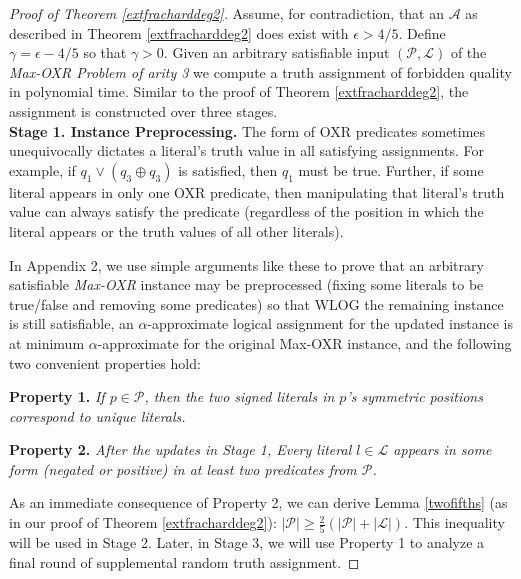\documentclass{article}
\newcommand{\ep}[0]{\epsilon}
\begin{document}
\begin{proof}[Proof of Theorem \ref{extfracharddeg2}]  Assume, for contradiction, that an $\mathcal{A}$ as described in Theorem \ref{extfracharddeg2} does exist with $\ep>4/5$. Define $\gamma=\ep-4/5$ so that $\gamma>0$. Given an arbitrary satisfiable input $(\mathcal{P}, \mathcal{L})$ of the \textit{Max-OXR Problem of arity 3} we compute a truth  assignment of forbidden quality in polynomial time. Similar to the proof of Theorem \ref{extfracharddeg2}, the assignment is constructed over three stages.\\

\noindent \textbf{Stage 1. Instance Preprocessing.} The form of OXR predicates sometimes unequivocally dictates a literal's truth value in all satisfying assignments. For example, if $q_1 \vee (q_3 \oplus q_3)$ is satisfied, then $q_1$ must be true. Further, if some literal appears in only one OXR predicate, then manipulating that literal's truth value can always satisfy the predicate (regardless of the position in which the literal appears or the truth values of all other literals).  

In Appendix 2,  we use simple arguments like these to prove that an arbitrary satisfiable \textit{Max-OXR} instance may be preprocessed (fixing some literals to be true/false and removing some predicates) so that
WLOG the remaining instance is still satisfiable, an $\alpha$-approximate logical assignment for the updated instance is at minimum $\alpha$-approximate for the original Max-OXR instance, and
the following two convenient properties hold:

\vspace{1mm}
\noindent \textbf{Property 1.} \textit{If $p\in \mathcal{P}$, then the two signed literals in $p$'s symmetric positions correspond to unique literals.} 
\vspace{1mm}


\noindent \textbf{Property 2.} \textit{After the updates in Stage 1, Every literal $l\in \mathcal{L}$ appears in some form (negated or positive) in at least two predicates from $\mathcal{P}$.}

\vspace{1mm}
\noindent As an immediate consequence of Property 2, we can derive Lemma \ref{twofifths} (as in our proof of Theorem \ref{extfracharddeg2}): $|\mathcal{P}|\geq \frac{2}{5}(|\mathcal{P}|+|\mathcal{L}|)$. This inequality will be used in Stage 2. Later, in Stage 3, we will use Property 1 to analyze a final round of supplemental random truth assignment.


\end{proof}
\end{document}

